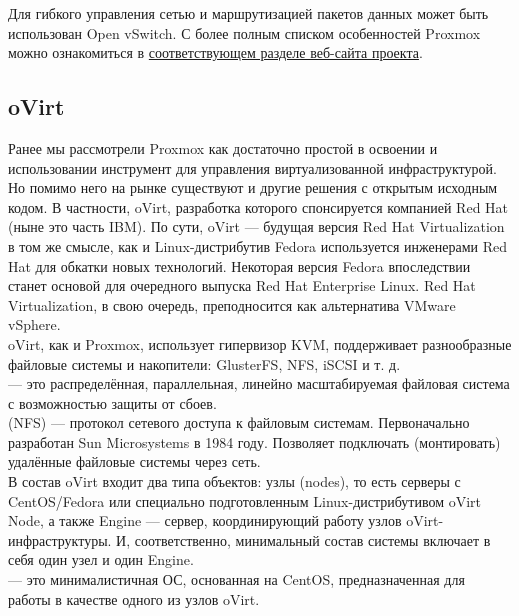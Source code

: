 \documentclass[14pt, a4paper]{article}
\begin{document}
Для гибкого управления сетью и маршрутизацией пакетов данных может быть использован Open
vSwitch. С более полным списком особенностей Proxmox можно ознакомиться в \href{https://www.proxmox.com/en/proxmox-ve/features}{соответствующем
разделе веб-сайта проекта}.

\subsection*{oVirt} 

Ранее мы рассмотрели Proxmox как достаточно простой в освоении и использовании инструмент для
управления виртуализованной инфраструктурой. Но помимо него на рынке существуют и другие
решения с открытым исходным кодом. В частности, oVirt, разработка которого спонсируется
компанией Red Hat (ныне это часть IBM). По сути, oVirt — будущая версия Red Hat Virtualization в том
же смысле, как и Linux-дистрибутив Fedora используется инженерами Red Hat для обкатки новых
технологий. Некоторая версия Fedora впоследствии станет основой для очередного выпуска Red Hat
Enterprise Linux. Red Hat Virtualization, в свою очередь, преподносится как альтернатива VMware
vSphere.\\

oVirt, как и Proxmox, использует гипервизор KVM, поддерживает разнообразные файловые системы и
накопители: GlusterFS, NFS, iSCSI и т. д.\\

\href{https://ru.wikipedia.org/wiki/GlusterFS}{} — это распределённая, параллельная, линейно масштабируемая файловая система с
возможностью защиты от сбоев.\\

\href{https://ru.wikipedia.org/wiki/Network_File_System}{} (NFS) — протокол сетевого доступа к файловым системам. Первоначально
разработан Sun Microsystems в 1984 году. Позволяет подключать (монтировать) удалённые файловые
системы через сеть.\\

В состав oVirt входит два типа объектов: узлы (nodes), то есть серверы с CentOS/Fedora или
специально подготовленным Linux-дистрибутивом oVirt Node, а также Engine — сервер,
координирующий работу узлов oVirt-инфраструктуры. И, соответственно, минимальный состав
системы включает в себя один узел и один Engine.\\

\href{https://www.ovirt.org/download/node.html}{} — это минималистичная ОС, основанная на CentOS, предназначенная для работы в
качестве одного из узлов oVirt.\\
\end{document}
